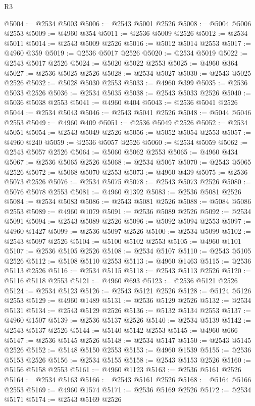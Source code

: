 \begin{lexlean}{R3}
\begin{coremodule}
@5004 := @2534 @5003
@5006 := @2543 @5001 @2526
@5008 := @5004 @5006 @2553
@5009 := @4960 @354
@5011 := @2536 @5009 @2526
@5012 := @2534 @5011
@5014 := @2543 @5009 @2526
@5016 := @5012 @5014 @2553
@5017 := @4960 @359
@5019 := @2536 @5017 @2526
@5020 := @2534 @5019
@5022 := @2543 @5017 @2526
@5024 := @5020 @5022 @2553
@5025 := @4960 @364
@5027 := @2536 @5025 @2526
@5028 := @2534 @5027
@5030 := @2543 @5025 @2526
@5032 := @5028 @5030 @2553
@5033 := @4960 @399
@5035 := @2536 @5033 @2526
@5036 := @2534 @5035
@5038 := @2543 @5033 @2526
@5040 := @5036 @5038 @2553
@5041 := @4960 @404
@5043 := @2536 @5041 @2526
@5044 := @2534 @5043
@5046 := @2543 @5041 @2526
@5048 := @5044 @5046 @2553
@5049 := @4960 @409
@5051 := @2536 @5049 @2526
@5052 := @2534 @5051
@5054 := @2543 @5049 @2526
@5056 := @5052 @5054 @2553
@5057 := @4960 @240
@5059 := @2536 @5057 @2526
@5060 := @2534 @5059
@5062 := @2543 @5057 @2526
@5064 := @5060 @5062 @2553
@5065 := @4960 @434
@5067 := @2536 @5065 @2526
@5068 := @2534 @5067
@5070 := @2543 @5065 @2526
@5072 := @5068 @5070 @2553
@5073 := @4960 @439
@5075 := @2536 @5073 @2526
@5076 := @2534 @5075
@5078 := @2543 @5073 @2526
@5080 := @5076 @5078 @2553
@5081 := @4960 @1392
@5083 := @2536 @5081 @2526
@5084 := @2534 @5083
@5086 := @2543 @5081 @2526
@5088 := @5084 @5086 @2553
@5089 := @4960 @1079
@5091 := @2536 @5089 @2526
@5092 := @2534 @5091
@5094 := @2543 @5089 @2526
@5096 := @5092 @5094 @2553
@5097 := @4960 @1427
@5099 := @2536 @5097 @2526
@5100 := @2534 @5099
@5102 := @2543 @5097 @2526
@5104 := @5100 @5102 @2553
@5105 := @4960 @1101
@5107 := @2536 @5105 @2526
@5108 := @2534 @5107
@5110 := @2543 @5105 @2526
@5112 := @5108 @5110 @2553
@5113 := @4960 @1463
@5115 := @2536 @5113 @2526
@5116 := @2534 @5115
@5118 := @2543 @5113 @2526
@5120 := @5116 @5118 @2553
@5121 := @4960 @693
@5123 := @2536 @5121 @2526
@5124 := @2534 @5123
@5126 := @2543 @5121 @2526
@5128 := @5124 @5126 @2553
@5129 := @4960 @1489
@5131 := @2536 @5129 @2526
@5132 := @2534 @5131
@5134 := @2543 @5129 @2526
@5136 := @5132 @5134 @2553
@5137 := @4960 @1507
@5139 := @2536 @5137 @2526
@5140 := @2534 @5139
@5142 := @2543 @5137 @2526
@5144 := @5140 @5142 @2553
@5145 := @4960 @666
@5147 := @2536 @5145 @2526
@5148 := @2534 @5147
@5150 := @2543 @5145 @2526
@5152 := @5148 @5150 @2553
@5153 := @4960 @1539
@5155 := @2536 @5153 @2526
@5156 := @2534 @5155
@5158 := @2543 @5153 @2526
@5160 := @5156 @5158 @2553
@5161 := @4960 @1123
@5163 := @2536 @5161 @2526
@5164 := @2534 @5163
@5166 := @2543 @5161 @2526
@5168 := @5164 @5166 @2553
@5169 := @4960 @1574
@5171 := @2536 @5169 @2526
@5172 := @2534 @5171
@5174 := @2543 @5169 @2526

\end{coremodule}
\end{lexlean}
